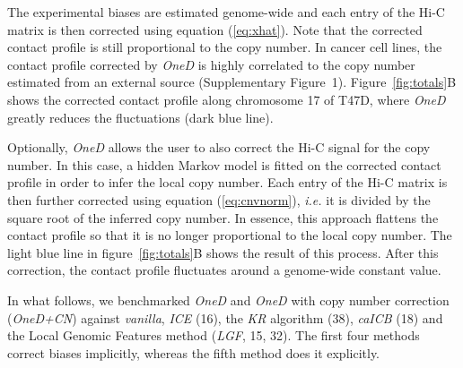 \documentclass[a4,center,fleqn]{NAR}
\providecommand{\DIFadd}[1]{{\protect\color{red}#1}} %
\providecommand{\DIFdel}[1]{{\protect}}                      %
\providecommand{\DIFaddbegin}{} %
\providecommand{\DIFaddend}{} %
\providecommand{\DIFdelbegin}{} %
\providecommand{\DIFdelend}{} %
\begin{document}
The experimental biases are estimated genome-wide and each \DIFdelbegin \DIFdel{cell of the
}\DIFdelend \DIFaddbegin \DIFadd{entry of the
Hi-C }\DIFaddend matrix is then corrected using equation (\ref{eq:xhat}). Note that
the corrected \DIFdelbegin \DIFdel{amount of contacts }\DIFdelend \DIFaddbegin \DIFadd{contact profile }\DIFaddend is still proportional to the copy number.
\DIFdelbegin \DIFdel{Figure~}\DIFdelend \DIFaddbegin \DIFadd{In cancer cell lines, the contact profile corrected by }\textit{\DIFadd{OneD}} \DIFadd{is
highly correlated to the copy number estimated from an external source
(Supplementary Figure~1). Figure~}\DIFaddend \ref{fig:totals}B shows the corrected
\DIFdelbegin \DIFdel{number of contacts }\DIFdelend \DIFaddbegin \DIFadd{contact profile }\DIFaddend along chromosome 17 of T47D\DIFdelbegin \DIFdel{. }\DIFdelend \DIFaddbegin \DIFadd{, where }\DIFaddend \textit{OneD} greatly
reduces the \DIFdelbegin \DIFdel{wiggling of the total amount of contacts (blue line). }\DIFdelend \DIFaddbegin \DIFadd{fluctuations (dark blue line).
}\DIFaddend 

\DIFaddbegin \DIFadd{Optionally, }\textit{\DIFadd{OneD}} \DIFadd{allows the user to also correct the Hi-C signal
for the copy number. In this case, a hidden Markov model is fitted on the
corrected contact profile in order to infer the local copy number. Each
entry of the Hi-C matrix is then further corrected using equation
(\ref{eq:cnvnorm}), }\textit{\DIFadd{i.e.}} \DIFadd{it is divided by the square root of the
inferred copy number. In essence, this approach flattens the contact
profile so that it is no longer proportional to the local copy number. The
light blue line in figure~\ref{fig:totals}B shows the result of this
process. After this correction, the contact profile fluctuates around a
genome-wide constant value.
}\DIFaddend 

In what follows, we benchmarked \textit{OneD} \DIFdelbegin \DIFdel{, }\DIFdelend \DIFaddbegin \DIFadd{and }\textit{\DIFadd{OneD}} \DIFadd{with copy
number correction (}\textit{\DIFadd{OneD+CN}}\DIFadd{) }\DIFaddend against \textit{vanilla},
\textit{ICE} (16), \DIFaddbegin \DIFadd{the }\textit{\DIFadd{KR}} \DIFadd{algorithm
(38), }\DIFaddend \textit{caICB} (18) and the
Local Genomic Features method (\textit{LGF}, 15, \DIFdelbegin \DIFdel{33}\DIFdelend \DIFaddbegin \DIFadd{32}\DIFaddend ). The first \DIFdelbegin \DIFdel{three
}\DIFdelend \DIFaddbegin \DIFadd{four }\DIFaddend methods correct biases implicitly,
whereas the \DIFdelbegin \DIFdel{fourth }\DIFdelend \DIFaddbegin \DIFadd{fifth }\DIFaddend method does it explicitly.
\end{document}
